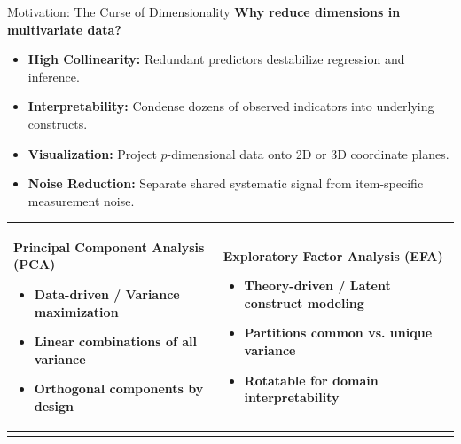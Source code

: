 \documentclass[aspectratio=169,ignorenonframetext]{beamer}
\begin{document}
\begin{frame}{Motivation: The Curse of Dimensionality}
\textbf{Why reduce dimensions in multivariate data?}

\begin{itemize}
\item
  \textbf{High Collinearity:} Redundant predictors destabilize
  regression and inference.
\item
  \textbf{Interpretability:} Condense dozens of observed indicators into
  underlying constructs.
\item
  \textbf{Visualization:} Project \(p\)-dimensional data onto 2D or 3D
  coordinate planes.
\item
  \textbf{Noise Reduction:} Separate shared systematic signal from
  item-specific measurement noise.
\end{itemize}

{\def\LTcaptype{none} %
\begin{longtable}[]{@{}
  >{\raggedright\arraybackslash}p{}
  >{\raggedright\arraybackslash}p{}@{}}
\toprule\noalign{}
\endhead
\begin{minipage}[t]{\linewidth}\raggedright
\textbf{Principal Component Analysis (PCA)}

\begin{itemize}
\item
  Data-driven / Variance maximization
\item
  Linear combinations of all variance
\item
  Orthogonal components by design
\end{itemize}
\end{minipage} & \begin{minipage}[t]{\linewidth}\raggedright
\textbf{Exploratory Factor Analysis (EFA)}

\begin{itemize}
\item
  Theory-driven / Latent construct modeling
\item
  Partitions \textbf{common} vs. \textbf{unique} variance
\item
  Rotatable for domain interpretability
\end{itemize}
\end{minipage} \\
\bottomrule\noalign{}
\end{longtable}
}
\end{frame}
\end{document}
